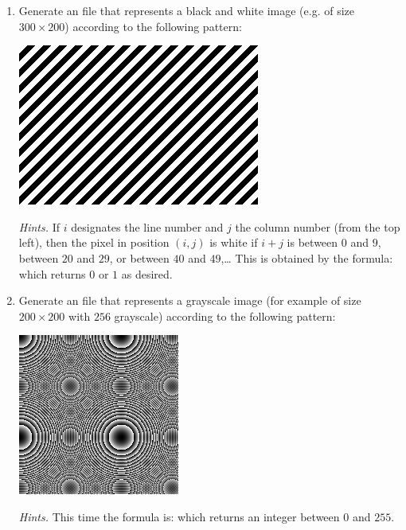 \documentclass[11pt,class=report,crop=false]{standalone}
\begin{document}
\begin{activite}



\begin{enumerate}
  \item Generate an  file that represents a black and white image (e.g. of size $300 \times 200$) according to the following pattern:
\begin{center}
\includegraphics[scale=\myscale,scale=0.5]{screen-image_nb}
\end{center}   

\emph{Hints.} If $i$ designates the line number and $j$ the column number (from the top left), then the pixel in position $(i,j)$ is white if $i+j$ is between $0$ and $9$, between $20$ and $29$, or between $40$ and $49$,\ldots{} This is obtained by the formula:
which returns $0$ or $1$ as desired.

  \item Generate an  file that represents a grayscale image (for example of size $200 \times 200$ with $256$ grayscale) according to the following pattern:
\begin{center}
\includegraphics[scale=\myscale,scale=0.7]{screen-image_gris}
\end{center}   

\emph{Hints.} This time the formula is:
which returns an integer between $0$ and $255$.


\end{enumerate}
\end{activite}
\end{document}

